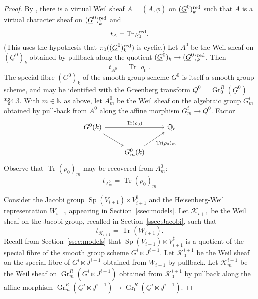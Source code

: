 \documentclass[10pt]{amsart}
\theoremstyle{plain}
\theoremstyle{definition}
\newcommand{\NN}{{\mathbb{N}}}
\newcommand{\EE}{\mathbb{\bar Q}_\ell}
\newcommand{\bFq}{\bar{k}}
\newcommand{\Fq}{k}
\DeclareMathOperator{\Gr}{Gr}
\DeclareMathOperator{\trace}{Tr}
\newcommand{\trFrob}[1]{t_{#1}}
\newcommand{\cs}[1]{{\mathcal{#1}}}
\newcommand{\Sp}{{\operatorname{Sp}}}
\begin{document}
\begin{proof}
By \cite{lusztig:disconnected1}, there is a virtual Weil sheaf $A = ({\bar A},\phi)$ on $(\underline{G}^0)_\Fq^\reductive$ such that ${\bar A}$ is a virtual character sheaf on $(\underline{G}^0)_{\bFq}^\reductive$ and
\[
\trFrob{A} = \trace \varrho_0^\reductive.
\]
(This uses the hypothesis that $\pi_0((\underline{G}^0)_\Fq^\reductive)$ is cyclic.)
Let $A^0$ be the Weil sheaf on $(\underline{G}^0)_\Fq$ obtained by pullback along the quotient $(\underline{G}^0)_\Fq \to (\underline{G}^0)_\Fq^\reductive$.
Then 
\[
\trFrob{A^0} = \trace \varrho_0.
\]
The special fibre $(\underline{G}^0)_\Fq$ of the smooth group scheme $\underline{G}^0$ is itself a smooth group scheme, and may be identified with the Greenberg transform $Q^0 = \Gr^{R}_0(\underline{G}^0)$ \cite{cunningham-roe:13a}*{\S 4.3}. 
With $m\in \NN$ as above, let ${A}_m^0$ be the Weil sheaf on the algebraic group $G_m^i$ obtained by pull-back from $A^0$ along the affine morphism $G_m^i \to Q^0$.
Factor
\[
\begin{tikzcd}
G^0(\Fq) \arrow{rr}{\trace(\rho_0)} \arrow{rd} && \EE \\
& G_m^0(\Fq) \arrow{ru}[swap]{\trace(\rho_0)_m} 
\end{tikzcd}
\]
Observe that $\trace(\rho_0)_m$ may be recovered from ${A}_m^0$:
\[
\trFrob{{A}^0_m} = \trace(\rho_0)_m
\]

Consider the Jacobi group $\Sp(V_{i+1})\ltimes V_{i+1}^\sharp$ and the Heisenberg-Weil representation $W_{i+1}$ appearing in Section~\ref{ssec:models}.
Let $\cs{K}_{i+1}$ be the Weil sheaf on the Jacobi group, recalled in Section~\ref{ssec:Jacobi}, such that
\[
\trFrob{\cs{K}_{i+1}} = \trace(W_{i+1}).
\]
Recall from Section~\ref{ssec:models} that $\Sp(V_{i+1})\ltimes V_{i+1}^\sharp$ is a quotient of the special fibre of the smooth group scheme $\underline{G}^{i} \ltimes \underline{J}^{i+1}$.
Let $\cs{K}_0^{i+1}$ be the Weil sheaf on the special fibre of $\underline{G}^{i} \ltimes \underline{J}^{i+1}$ obtained from $W_{i+1}$ by pullback. 
Let $\cs{K}_m^{i+1}$ be the Weil sheaf on $\Gr^{R}_m(\underline{G}^{i} \ltimes \underline{J}^{i+1})$ obtained from $\cs{K}_0^{i+1}$ by pullback along the affine morphism
$\Gr^{R}_m(\underline{G}^{i} \ltimes \underline{J}^{i+1}) \to \Gr^{R}_0(\underline{G}^{i} \ltimes \underline{J}^{i+1})$.


\end{proof}
\end{document}
